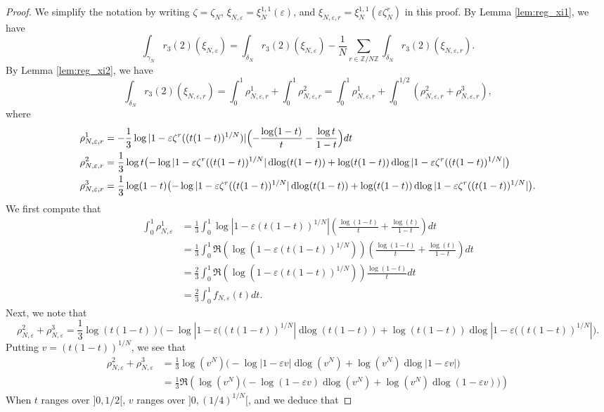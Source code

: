 \documentclass[11pt,a4,leqno]{amsart}
\theoremstyle{my theoremstyle}
\theoremstyle{dfn}
\theoremstyle{remark}
\renewcommand{\1}{\mathbbm{1}}
\newcommand{\Z}{\mathbb{Z}}
\newcommand{\e}{\varepsilon}
\newcommand{\z}{\zeta}
\numberwithin{equation}{section}
\newcommand{\dlog}{\operatorname{dlog}}
\begin{document}
\begin{proof}
    We simplify the notation by writing $\z=\z_N$, $\xi_{N, \e}=\xi_N^{1,1}(\e)$, and $\xi_{N, \e, r}=\xi_N^{1,1}(\e \zeta_N^r)$ in this proof. By Lemma \ref{lem:reg_xi1}, we have 
\[
\int_{\gamma_N} r_3(2)(\xi_{N,\e})=\int_{\delta_N} r_3(2)(\xi_{N, \e}) - \frac{1}{N} \sum_{r \in \Z/N\Z} \int_{\delta_N} r_3(2)(\xi_{N, \e, r}).
\]
By Lemma \ref{lem:reg_xi2}, we have 
\[
\int_{\delta_N} r_3(2)(\xi_{N,\e, r})=\int_0^1 \rho_{N,\e, r}^1 + \int_0^{1} \rho_{N,\e, r}^2=\int_0^1 \rho_{N,\e, r}^1 + \int_0^{1/2} (\rho_{N,\e, r}^2 + \rho_{N,\e, r}^3),
\]
where 
\begin{align*}
    \rho_{N,\e, r}^1 & = -\frac13 \log |1- \e\zeta^r((t(1-t))^{1/N})| \Bigl( -\frac{\log (1-t)}{t} - \frac{\log t}{1-t} \Bigr) dt \\
    \rho_{N,\e, r}^2 & = \frac{1}{3} \log t \bigl( -\log |1 -\e \zeta^r((t(1-t))^{1/N}| \dlog (t(1-t)) + \log (t(1-t)) \dlog |1 -\e \zeta^r((t(1-t))^{1/N}|\bigr) \\
    \rho_{N,\e, r}^3 & = \frac{1}{3} \log (1-t) \bigl( -\log |1 -\e \zeta^r((t(1-t))^{1/N}| \dlog (t(1-t)) + \log (t(1-t)) \dlog |1 -\e \zeta^r((t(1-t))^{1/N}|\bigr).
\end{align*}
We first compute that
\begin{align*}
    \int_0^1 \rho_{N, \e}^1 & = \frac{1}{3}\int_0^1 \log|1-\e(t(1-t))^{1/N}| \left( \frac{\log(1-t)}{t} + \frac{\log(t)}{1-t} \right)dt \\ 
    & = \frac{1}{3}  \int_0^1 \Re(\log(1-\e(t(1-t))^{1/N})) \left( \frac{\log(1-t)}{t} + \frac{\log(t)}{1-t} \right)dt \\ 
    & =\frac{2}{3} \int_0^{1} \Re(\log(1 -\e(t(1-t))^{1/N})) \frac{\log(1-t)}{t} dt  \\
    & = \frac{2}{3}\int_0^{1} f_{N,\e}(t) dt.
\end{align*}
Next, we note that 
\[
\rho_{N, \e}^2+\rho_{N, \e}^3=\frac{1}{3} \log (t(1-t)) \bigl( -\log |1 -\e ((t(1-t))^{1/N}| \dlog (t(1-t)) + \log (t(1-t)) \dlog |1 -\e ((t(1-t))^{1/N}|\bigr).
\]
Putting $v=(t(1-t))^{1/N}$, we see that 
\begin{align*}
\rho_{N, \e}^2+\rho_{N, \e}^3 &=\frac{1}{3} \log (v^N) \bigl( -\log |1 -\e v| \dlog (v^N) + \log (v^N) \dlog |1 -\e v|\bigr) \\
&=\frac{1}{3} \Re\left(\log (v^N) \bigl( -\log (1 -\e v)\dlog (v^N) + \log (v^N) \dlog (1 -\e v)\bigr) \right)
\end{align*}
When $t$ ranges over $]0, 1/2[$, $v$ ranges over $]0,(1/4)^{1/N}[$, and 
we deduce that 

\end{proof}
\end{document}
